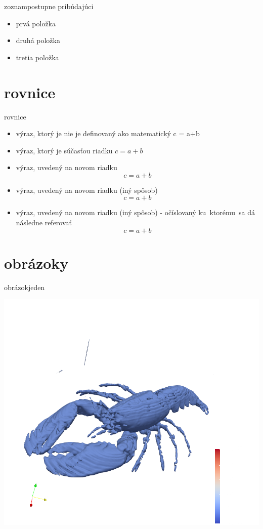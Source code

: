 \documentclass{beamer}
\begin{document}
\begin{frame}{zoznam}{postupne pribúdajúci}
\begin{itemize}
    \item<1-1> prvá položka
    \item<2-> druhá položka
    \item<3-> tretia položka
\end{itemize}
\end{frame}

\section{rovnice}

\begin{frame}{rovnice}
\begin{itemize}
    \item výraz, ktorý je nie je definovaný ako matematický c = a+b
    \item výraz, ktorý je súčasťou riadku $c = a+b$
    \item výraz, uvedený na novom riadku $$c = a+b$$
    \item výraz, uvedený na novom riadku (iný spôsob) 
    \begin{equation*}
        c = a+b
    \end{equation*}
    \item výraz, uvedený na novom riadku (iný spôsob) - očíslovaný ku~ktorému~sa dá následne referovať
    \begin{equation}
        c = a+b
    \end{equation}
\end{itemize}
\end{frame}

\section{obrázoky}

\begin{frame}{obrázok}{jeden}
\begin{center}
    \includegraphics[width= .5 \linewidth]{lobster.png}    
\end{center}


\end{frame}
\end{document}
